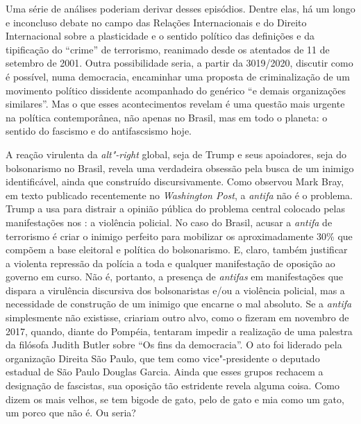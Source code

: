 Uma série de análises poderiam derivar desses episódios. Dentre elas, há
um longo e inconcluso debate no campo das Relações Internacionais e do
Direito Internacional sobre a plasticidade e o sentido político das
definições e da tipificação do ``crime'' de terrorismo, reanimado desde
os atentados de 11 de setembro de 2001. Outra possibilidade seria, a
partir da  3019/2020, discutir como é possível, numa democracia,
encaminhar uma proposta de criminalização de um movimento político
dissidente acompanhado do genérico ``e demais organizações similares''.
Mas o que esses acontecimentos revelam é uma questão mais urgente na
política contemporânea, não apenas no Brasil, mas em todo o planeta: o
sentido do fascismo e do antifascsismo hoje.

A reação virulenta da \emph{alt"-right} global, seja de Trump e seus
apoiadores, seja do bolsonarismo no Brasil, revela uma verdadeira
obsessão pela busca de um inimigo identificável, ainda que construído
discursivamente. Como observou Mark Bray, em texto publicado
recentemente no \emph{Washington Post}, a \emph{antifa} não é o
problema. Trump a usa para distrair a opinião pública do problema
central colocado pelas manifestações nos : a violência policial. No
caso do Brasil, acusar a \emph{antifa} de terrorismo é criar o inimigo
perfeito para mobilizar os aproximadamente 30\% que compõem a base
eleitoral e política do bolsonarismo. E, claro, também justificar a
violenta repressão da polícia a toda e qualquer manifestação de oposição
ao governo em curso. Não é, portanto, a presença de \emph{antifas} em
manifestações que dispara a virulência discursiva dos bolsonaristas e/ou
a violência policial, mas a necessidade de construção de um inimigo que
encarne o mal absoluto. Se a \emph{antifa} simplesmente não existisse,
criariam outro alvo, como o fizeram em novembro de 2017, quando, diante
do  Pompéia, tentaram impedir a realização de uma palestra da
filósofa Judith Butler sobre ``Os fins da democracia''. O ato foi
liderado pela organização Direita São Paulo, que tem como
vice"-presidente o deputado estadual de São Paulo Douglas Garcia. Ainda
que esses grupos rechacem a designação de fascistas, sua oposição tão
estridente revela alguma coisa. Como dizem os mais velhos, se tem bigode
de gato, pelo de gato e mia como um gato, um porco que não é. Ou seria?

